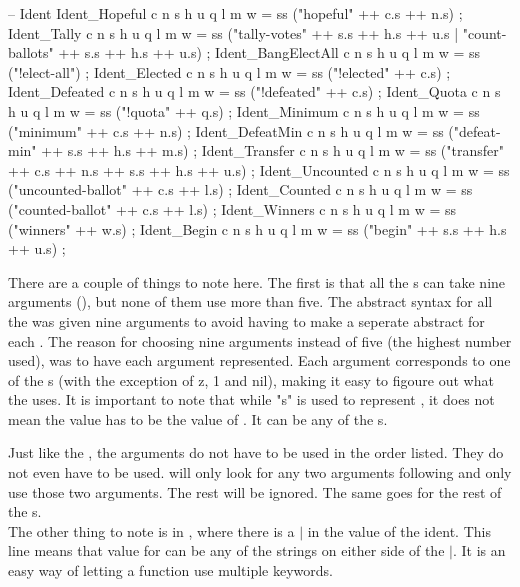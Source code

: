 \begin{lstgf}
        -- Ident
        Ident_Hopeful c n s h u q l m w
            = ss ("hopeful" ++ c.s ++ n.s) ;
        Ident_Tally c n s h u q l m w
            = ss ("tally-votes" ++ s.s ++ h.s ++ u.s | "count-ballots" ++ s.s ++ h.s ++ u.s) ;
        Ident_BangElectAll c n s h u q l m w
            = ss ("!elect-all") ;
        Ident_Elected c n s h u q l m w
            = ss ("!elected" ++ c.s) ;
        Ident_Defeated c n s h u q l m w
            = ss ("!defeated" ++ c.s) ;
        Ident_Quota c n s h u q l m w
            = ss ("!quota" ++ q.s) ;
        Ident_Minimum c n s h u q l m w
            = ss ("minimum" ++ c.s ++ n.s) ;
        Ident_DefeatMin c n s h u q l m w
            = ss ("defeat-min" ++ s.s ++ h.s ++ m.s) ;
        Ident_Transfer c n s h u q l m w
            = ss ("transfer" ++ c.s ++ n.s ++ s.s ++ h.s ++ u.s) ;
        Ident_Uncounted c n s h u q l m w
            = ss ("uncounted-ballot" ++ c.s ++ l.s) ;
        Ident_Counted c n s h u q l m w
            = ss ("counted-ballot" ++ c.s ++ l.s) ;
        Ident_Winners c n s h u q l m w
            = ss ("winners" ++ w.s) ;
        Ident_Begin c n s h u q l m w
            = ss ("begin" ++ s.s ++ h.s ++ u.s) ;
\end{lstgf}
There are a couple of things to note here. The first is that all the s can take nine arguments (), but none of them use more than five. The abstract syntax for all the  was given nine arguments to avoid having to make a seperate abstract for each . The reason for choosing nine arguments instead of five (the highest number used), was to have each argument represented. Each argument corresponds to one of the s (with the exception of z, 1 and nil), making it easy to figoure out what the  uses. It is important to note that while "s" is used to represent , it does not mean the value has to be the value of . It can be any of the s. 

Just like the , the arguments do not have to be used in the order listed. They do not even have to be used.  will only look for any two arguments following and only use those two arguments. The rest will be ignored. The same goes for the rest of the s. \\
The other thing to note is in , where there is a $|$ in the value of the ident. This line means that value for  can be any of the strings on either side of the $|$. It is an easy way of letting a function use multiple keywords.


